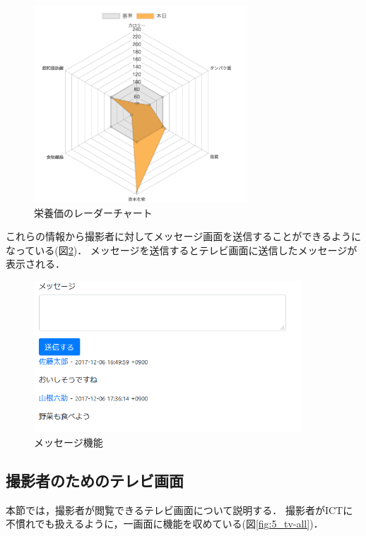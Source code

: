 \documentclass[../report]{subfiles}
\begin{document}
\begin{figure}[htbp]
    \begin{center}
        \includegraphics[width=8cm]{imgs/6_radar.png}
        \caption{栄養価のレーダーチャート}
        \label{fig:5_radar}
    \end{center}
\end{figure}

これらの情報から撮影者に対してメッセージ画面を送信することができるようになっている(図\ref{fig:5_message})．
メッセージを送信するとテレビ画面に送信したメッセージが表示される．

\begin{figure}[htbp]
    \begin{center}
        \includegraphics[width=10cm]{imgs/5_day3.png}
        \caption{メッセージ機能}
        \label{fig:5_message}
    \end{center}
\end{figure}

\subsection{撮影者のためのテレビ画面}
本節では，撮影者が閲覧できるテレビ画面について説明する．
撮影者がICTに不慣れでも扱えるように，一画面に機能を収めている(図\ref{fig:5_tv-all})．
\end{document}
